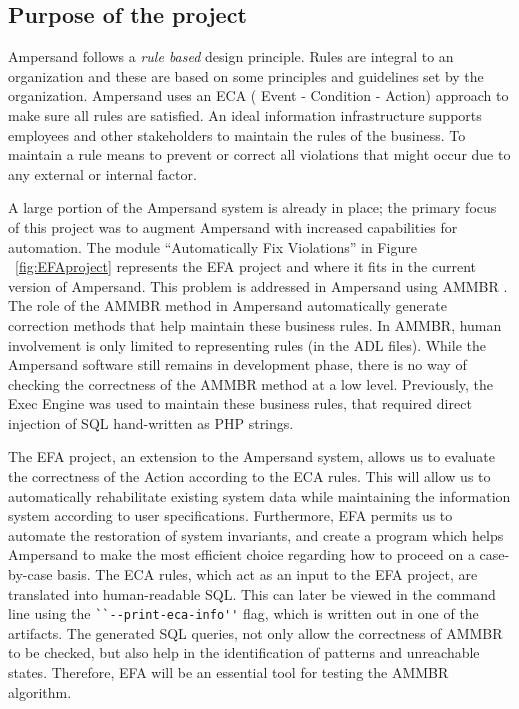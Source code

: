 %

\subsection{Purpose of the project}

Ampersand follows a \emph{rule based} design principle. Rules are integral to an organization
and these are based on some principles and guidelines set by the organization.
Ampersand uses an ECA ( Event - Condition - Action) approach to make sure all rules are satisfied. An ideal information infrastructure supports employees and other stakeholders to maintain the rules of the business. To maintain a rule means to prevent or correct all violations that might occur due to any external or internal factor.
 
 A large portion of the Ampersand system is already in place; the primary focus of this project was to
augment Ampersand with increased capabilities for automation. The module ``Automatically Fix Violations'' in Figure ~\ref{fig:EFAproject} represents the EFA project and where it fits in the current version of Ampersand.
 This problem is addressed in Ampersand using AMMBR 
\citep{Ampersand}. The role 
of the AMMBR method in Ampersand automatically generate correction methods that 
help maintain these business rules. In AMMBR, human involvement is only limited 
to representing rules (in the ADL files). While the Ampersand software still 
remains in development phase, there is no way of checking the correctness of 
the AMMBR method at a low level. Previously, the Exec Engine was used to 
maintain these business rules, that required direct injection of SQL 
hand-written as PHP strings. 
 
The EFA project, an extension to the Ampersand system, allows us to evaluate 
the correctness of the Action according to the ECA rules. This will 
allow us to automatically rehabilitate existing system data while 
maintaining the information system according to user specifications. 
Furthermore, EFA permits us to automate the restoration of system invariants, 
and create a program which helps Ampersand to make the most efficient choice 
regarding how to proceed on a case-by-case basis. The ECA rules, which act as 
an 
input to the EFA project, are translated into human-readable SQL. This can 
later 
be viewed in the command line using the \verb|``--print-eca-info''| flag, which 
is written out in one of the artifacts. The generated SQL queries, not only 
allow  the correctness of AMMBR to be checked, but also help in the 
identification of patterns and unreachable states. Therefore, EFA will be an 
essential tool for testing the AMMBR algorithm.


